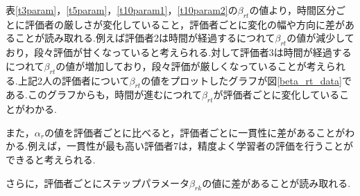 \documentclass[a4paper,11pt,oneside,openany]{jsbook}
\begin{document}
表\ref{t3param}，\ref{t5param}，\ref{t10param1}，\ref{t10param2}の$\beta_{rt}$の値より，時間区分ごとに評価者の厳しさが変化していること，評価者ごとに変化の幅や方向に差があることが読み取れる.例えば評価者2は時間が経過するにつれて$\beta_{rt}$の値が減少しており，段々評価が甘くなっていると考えられる.対して評価者3は時間が経過するにつれて$\beta_{rt}$の値が増加しており，段々評価が厳しくなっていることが考えられる.上記2人の評価者について$\beta_{rt}$の値をプロットしたグラフが図\ref{beta_rt_data}である.このグラフからも，時間が進むにつれて$\beta_{rt}$が評価者ごとに変化していることがわかる.

また，$\alpha_r$の値を評価者ごとに比べると，評価者ごとに一貫性に差があることがわかる.例えば，一貫性が最も高い評価者7は，精度よく学習者の評価を行うことができると考えられる.

さらに，評価者ごとにステップパラメータ$\beta_{rk}$の値に差があることが読み取れる.
\end{document}
